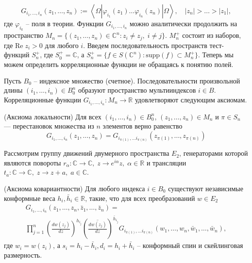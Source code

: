 \begin{equation}
  \label{eq:50}
  G_{i_{1},\dots ,i_{n}}(z_{1},\dots,z_{n}):=\left<\Omega|\varphi_{i_{1}}(z_{1})\dots \varphi_{i_{n}}(z_{n})|\Omega\right>, \quad |z_{n}|>\dots > |z_{1}|,
\end{equation}
где $\varphi_{i_{k}}$ -- поля в теории. Функции $G_{i_{1},\dots,i_{n}}$ можно аналитически продолжить на пространство $M_{n}=\{(z_{1},\dots,z_{n})\in \mathbb{C}^{n}: z_{i}\neq z_{j},\; i\neq j\}$. $M_{n}^{+}$ состоит из наборов, где $\mathrm{Re}\;z_{i}>0$ для любого $i$. Введем последовательность пространств тест-функций $S_{n}^{+}$, где $S_{0}^{+}=\mathbb{C}$, а $S_{n}^{+}=\{f\in S(\mathbb{C}^{n}): \mathrm{supp}(f)\subset M^{+}_{n}\} $. Теперь мы можем определить корреляционные функции не обращаясь к понятию полей. 

  Пусть $B_{0}$ -- индексное множество (счетное). Последовательности произвольной длины $(i_{1},\dots,i_{n})\in B_{0}^{n}$ образуют пространство мультииндексов $i\in B$.  Корреляционные функции $G_{i_{1},\dots, i_{n}}:M_{n}\to \mathbb{R}$ удовлетворяют следующим аксиомам.
\begin{axiom}
  (Аксиома локальности)
  Для всех $(i_{1},\dots,i_{n})\in B_{0}^{n}$, $(z_{1},\dots, z_{n})\in M_{n}$ и $\pi\in S_{n}$ --- перестановок множества из $n$ элементов верно равенство
  \begin{equation}
    \label{eq:51}
    G_{i_{1},\dots,i_{n}}(z_{1},\dots,z_{n})=G_{i_{\pi(1)},\dots i_{\pi(n)}}(z_{\pi(1)},\dots, z_{\pi(n)})
  \end{equation}
\end{axiom}
Рассмотрим группу движений двумерного пространства $E_{2}$, генераторами которой являются повороты $r_{\alpha}:\mathbb{C}\to\mathbb{C}, \; z\to e^{i\alpha}z,\; \alpha\in \mathbb{R}$ и трансляции $t_{a}:\mathbb{C}\to\mathbb{C},\; z\to z+a,\; a\in\mathbb{C}$. 
\begin{axiom}
  (Аксиома ковариантности)
  Для любого индекса $i\in B_{0}$  существуют независимые конформные веса $h_{i},\bar h_{i}\in \mathbb{R}$, такие, что для всех преобразований $w\in E_{2}$
  \begin{multline}
    \label{eq:52}
    G_{i_{1},\dots,i_{n}}(z_{1},\dots,z_{n},\bar z_{1},\dots, \bar z_{n})=\\
\prod_{j=1}^{n}\left(\frac{dw(z_{j})}{dz}\right)^{h_{i_{j}}}\left(\overline{\frac{dw(z_{j})}{dz}}\right)^{\bar{h}_{i_{j}}} G_{i_{\pi(1)},\dots i_{\pi(n)}}(w_{1},\dots, w_{n},\bar w_{1},\dots,\bar w_{n}),
  \end{multline}
где $w_{i}=w(z_{i})$, а $s_{i}=h_{i}-\bar h_{i}, d_{i}=h_{i}+\bar h_{i}$  -- конформный спин и скейлинговая размерность.
\end{axiom}
